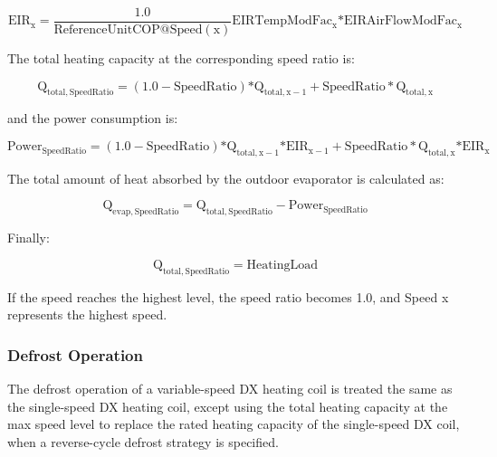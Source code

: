 \begin{equation}
{\mathrm{EI}}{{\mathrm{R}}_{\mathrm{x}}} = \frac{{1.0}}{{{\mathrm{ReferenceUnitCOP}}@{\mathrm{Speed}}({\mathrm{x}})}}{\mathrm{EIRTempModFa}}{{\mathrm{c}}_{\mathrm{x}}}{\mathrm{*EIRAirFlowModFa}}{{\mathrm{c}}_{\mathrm{x}}}
\end{equation}

The total heating capacity at the corresponding speed ratio is:

\begin{equation}
{{\mathrm{Q}}_{{\mathrm{total}},{\mathrm{SpeedRatio}}}} = \left( {1.0 - {\mathrm{SpeedRatio}}} \right){\mathrm{*}}{{\mathrm{Q}}_{{\mathrm{total}},{\mathrm{x}} - 1}} + {\mathrm{SpeedRatio*}}{{\mathrm{Q}}_{{\mathrm{total}},{\mathrm{x}}}}
\end{equation}

and the power consumption is:

\begin{equation}
{\mathrm{Powe}}{{\mathrm{r}}_{{\mathrm{SpeedRatio}}}} = \left( {1.0 - {\mathrm{SpeedRatio}}} \right){\mathrm{*}}{{\mathrm{Q}}_{{\mathrm{total}},{\mathrm{x}} - 1}}{\mathrm{*EI}}{{\mathrm{R}}_{{\mathrm{x}} - 1}} + {\mathrm{SpeedRatio*}}{{\mathrm{Q}}_{{\mathrm{total}},{\mathrm{x}}}}{\mathrm{*EI}}{{\mathrm{R}}_{\mathrm{x}}}
\end{equation}

The total amount of heat absorbed by the outdoor evaporator is calculated as:

\begin{equation}
{{\mathrm{Q}}_{{\mathrm{evap}},{\mathrm{SpeedRatio}}}} = {{\mathrm{Q}}_{{\mathrm{total}},{\mathrm{SpeedRatio}}}} - {\mathrm{Powe}}{{\mathrm{r}}_{{\mathrm{SpeedRatio}}}}
\end{equation}

Finally:

\begin{equation}
{{\mathrm{Q}}_{{\mathrm{total}},{\mathrm{SpeedRatio}}}} = {\mathrm{HeatingLoad}}
\end{equation}

If the speed reaches the highest level, the speed ratio becomes 1.0, and Speed x represents the highest speed.

\subsubsection{Defrost Operation}\label{defrost-operation-1}

The defrost operation of a variable-speed DX heating coil is treated the same as the single-speed DX heating coil, except using the total heating capacity at the max speed level to replace the rated heating capacity of the single-speed DX coil, when a reverse-cycle defrost strategy is specified.

